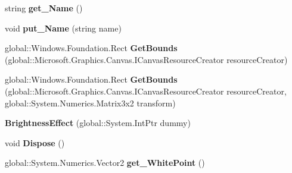 \begin{DoxyCompactItemize}
\item 
\mbox{\label{class_microsoft_1_1_graphics_1_1_canvas_1_1_effects_1_1_brightness_effect_a57e651585fb8ea19368198adf588fb9a}} 
string {\bfseries get\+\_\+\+Name} ()
\item 
\mbox{\label{class_microsoft_1_1_graphics_1_1_canvas_1_1_effects_1_1_brightness_effect_a97418ff747b7dcfe8997e112ae0866f1}} 
void {\bfseries put\+\_\+\+Name} (string name)
\item 
\mbox{\label{class_microsoft_1_1_graphics_1_1_canvas_1_1_effects_1_1_brightness_effect_a85bede8b46414570c1d780054b84beff}} 
global\+::\+Windows.\+Foundation.\+Rect {\bfseries Get\+Bounds} (global\+::\+Microsoft.\+Graphics.\+Canvas.\+I\+Canvas\+Resource\+Creator resource\+Creator)
\item 
\mbox{\label{class_microsoft_1_1_graphics_1_1_canvas_1_1_effects_1_1_brightness_effect_a2ff8861d383cf6930766e1f6da167f7d}} 
global\+::\+Windows.\+Foundation.\+Rect {\bfseries Get\+Bounds} (global\+::\+Microsoft.\+Graphics.\+Canvas.\+I\+Canvas\+Resource\+Creator resource\+Creator, global\+::\+System.\+Numerics.\+Matrix3x2 transform)
\item 
\mbox{\label{class_microsoft_1_1_graphics_1_1_canvas_1_1_effects_1_1_brightness_effect_a3e6e5d15295d036a491135b47f360da7}} 
{\bfseries Brightness\+Effect} (global\+::\+System.\+Int\+Ptr dummy)
\item 
\mbox{\label{class_microsoft_1_1_graphics_1_1_canvas_1_1_effects_1_1_brightness_effect_afaaded4b2565482485f12b97a40a0da8}} 
void {\bfseries Dispose} ()
\item 
\mbox{\label{class_microsoft_1_1_graphics_1_1_canvas_1_1_effects_1_1_brightness_effect_af8c1beaca4eb324bb24eaae396efa916}} 
global\+::\+System.\+Numerics.\+Vector2 {\bfseries get\+\_\+\+White\+Point} ()

\end{DoxyCompactItemize}

